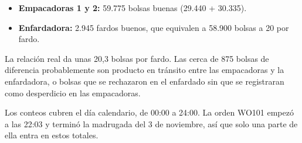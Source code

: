 \begin{singlespace}
{\begin{itemize}
\item \textbf{Empacadoras 1 y 2:} 59.775 bolsas buenas (29.440 + 30.335).
\end{itemize}
\begin{itemize}\setlength{\itemsep}{0pt}
\item \textbf{Enfardadora:} 2.945 fardos buenos, que equivalen a 58.900 bolsas a 20 por fardo.
\end{itemize}
La relación real da unas 20,3 bolsas por fardo. Las cerca de 875 bolsas de diferencia probablemente son producto en tránsito entre las empacadoras y la enfardadora, o bolsas que se rechazaron en el enfardado sin que se registraran como desperdicio en las empacadoras.\par
Los conteos cubren el día calendario, de 00:00 a 24:00. La orden WO101 empezó a las 22:03 y terminó la madrugada del 3 de noviembre, así que solo una parte de ella entra en estos totales.\par}



\end{singlespace}
